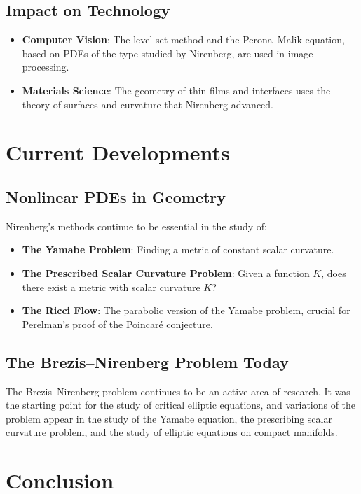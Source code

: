 \subsection{Impact on Technology}

\begin{itemize}
\item \textbf{Computer Vision}: The level set method and the Perona--Malik equation, based on PDEs of the type studied by Nirenberg, are used in image processing.

\item \textbf{Materials Science}: The geometry of thin films and interfaces uses the theory of surfaces and curvature that Nirenberg advanced.
\end{itemize}

\section{Current Developments}

\subsection{Nonlinear PDEs in Geometry}

Nirenberg's methods continue to be essential in the study of:
\begin{itemize}
\item \textbf{The Yamabe Problem}: Finding a metric of constant scalar curvature.
\item \textbf{The Prescribed Scalar Curvature Problem}: Given a function $K$, does there exist a metric with scalar curvature $K$?
\item \textbf{The Ricci Flow}: The parabolic version of the Yamabe problem, crucial for Perelman's proof of the Poincar\'e conjecture.
\end{itemize}

\subsection{The Brezis--Nirenberg Problem Today}

The Brezis--Nirenberg problem continues to be an active area of research. It was the starting point for the study of critical elliptic equations, and variations of the problem appear in the study of the Yamabe equation, the prescribing scalar curvature problem, and the study of elliptic equations on compact manifolds.

\section{Conclusion}

